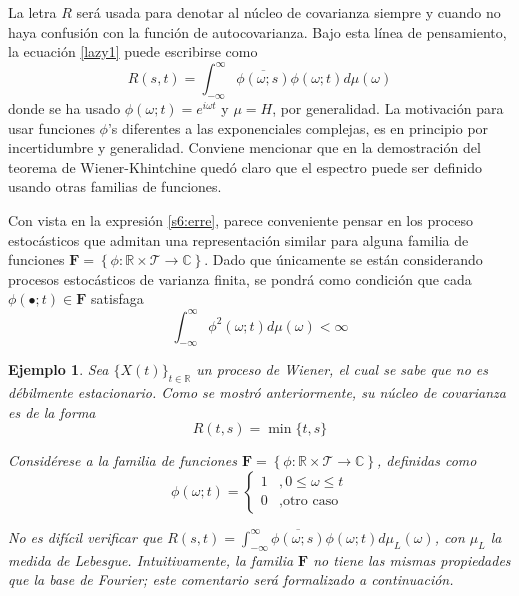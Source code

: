 \documentclass[12pt,letterpaper]{book}
\newtheorem{ejemplo}{Ejemplo}[chapter]
\newcommand{\R}{\mathbb{R}}
\newcommand{\C}{\mathbb{C}}
\newcommand{\intR}{\int_{-\infty}^{\infty}}
\newcommand{\ef}{\mathbf{F}}
\newcommand{\xtin}[1]{$\{X(t)\}_{t\in \mathcal{ #1 }}$ }
\begin{document}
La letra $R$ será usada para denotar al núcleo de covarianza siempre y cuando no haya confusión con la función de autocovarianza. 
%
Bajo esta línea de pensamiento, 
%
la ecuación \ref{lazy1} puede escribirse como
\begin{equation}
R(s,t) = \intR \overline{\phi(\omega;s)}\phi(\omega;t) d\mu(\omega)
\label{s6:erre}
\end{equation}
donde se ha usado $\phi(\omega; t) = e^{i \omega t}$ y $\mu = H$, por generalidad.
%
La motivación para usar funciones $\phi$'s diferentes a las exponenciales complejas, es en principio por incertidumbre y generalidad.
%
Conviene mencionar que en la demostración del teorema de Wiener-Khintchine quedó claro que el espectro puede ser definido usando otras familias de funciones.

Con vista en la expresión \ref{s6:erre}, parece conveniente pensar en los proceso estocásticos que admitan una representación similar para alguna familia de funciones $\ef = \left\{ \phi: \R \times \mathcal{T} \rightarrow \C \right\}$. 
%
Dado que únicamente se están considerando procesos estocásticos de varianza finita, 
se
pondrá como condición que cada $\phi(\bullet;t) \in \ef$ satisfaga
\begin{equation}
\intR \phi^{2}(\omega;t) d\mu(\omega) < \infty
\end{equation}

\begin{ejemplo}
Sea \xtin{\R} un proceso de Wiener, el cual se sabe que no es débilmente estacionario.
%
Como se mostró anteriormente, su núcleo de covarianza es de la forma
\begin{equation}
R(t,s) = \min \{ t , s \}
\end{equation}

Considérese a la familia de funciones $\ef = \left\{ \phi: \R \times \mathcal{T} \rightarrow \C \right\}$, definidas como
\begin{equation}
\phi(\omega; t) = \begin{cases}
1 &, 0 \leq \omega \leq t \\
0 &, \text{otro caso}
\end{cases}
\end{equation}

No es difícil verificar que $R(s,t) = \intR \overline{\phi(\omega;s)}\phi(\omega;t) d\mu_L(\omega)$, con $\mu_L$ la medida de Lebesgue.
%
Intuitivamente, la familia $\ef$ no tiene las mismas propiedades que la base de Fourier; este comentario será formalizado a continuación.
\end{ejemplo}
\end{document}
